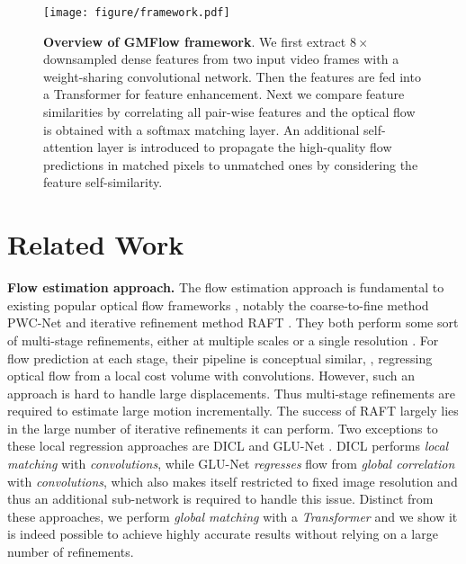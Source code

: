 \documentclass[10pt,twocolumn,letterpaper]{article}
\begin{document}
\begin{figure*}
    \centering
    \texttt{[image: figure/framework.pdf]}
    \vspace{-14pt}
    \caption{\textbf{Overview of GMFlow framework}. We first extract $8\times$ downsampled dense features from two input video frames with a weight-sharing convolutional network. Then the features are fed into a Transformer for feature enhancement. Next we compare feature similarities by correlating all pair-wise features and the optical flow is obtained with a softmax matching layer. An additional self-attention layer is introduced to propagate the high-quality flow predictions in matched pixels to unmatched ones by considering the feature self-similarity.}
    \label{fig:overview}
    \vspace{-14pt}
\end{figure*}

\section{Related Work}



{\bf Flow estimation approach.} The flow estimation approach is fundamental to existing popular optical flow frameworks \cite{ilg2017flownet,sun2018pwc,hur2019iterative,teed2020raft,xu2021high,Jiang_2021_ICCV,Zhang_2021_ICCV}, notably the coarse-to-fine method PWC-Net \cite{sun2018pwc} and iterative refinement method RAFT \cite{teed2020raft}. They both perform some sort of multi-stage refinements, either at multiple scales \cite{sun2018pwc} or a single resolution \cite{teed2020raft}. For flow prediction at each stage, their pipeline is conceptual similar, \ie, regressing optical flow from a local cost volume with convolutions. However, such an approach is hard to handle large displacements. Thus multi-stage refinements are required to estimate large motion incrementally. The success of RAFT largely lies in the large number of iterative refinements it can perform. Two exceptions to these local regression approaches are DICL \cite{wang2020displacement} and GLU-Net \cite{truong2020glu}. DICL performs \emph{local matching} with \emph{convolutions}, while GLU-Net \emph{regresses} flow from \emph{global correlation} with \emph{convolutions}, which also makes itself restricted to fixed image resolution and thus an additional sub-network is required to handle this issue. Distinct from these approaches, we perform \emph{global matching} with a \emph{Transformer} and we show it is indeed possible to achieve highly accurate results without relying on a large number of refinements.
\end{document}
